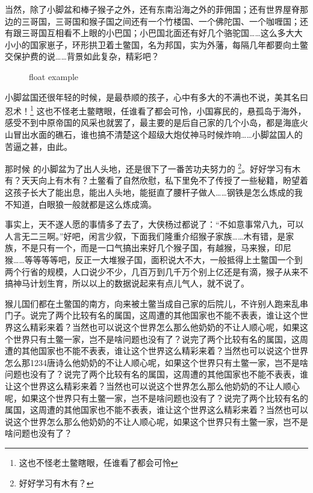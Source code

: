\documentclass{article}%
\begin{document}

\drawgrid{\linewidth}%
当然，除了小脚盆和棒子猴子之外，还有东南沿海之外的菲佣国；还有世界屋脊那边的三哥国，三哥国和猴子国之间还有一个竹楼国、一个佛陀国、一个咖喱国；还有跟三哥国互相看不上眼的小巴国；小巴国北面还有好几个骆驼国……这么多大大小小的国家崽子，环形拱卫着土鳖国，名为邦国，实为外藩，每隔几年都要向土鳖交保护费的说……背景如此复杂，精彩吧？


\begin{figure}[b]
  \centering
  \caption{float example}\label{fig:floateg}
\end{figure}

\newlength{\zitigao}

小脚盆国还很年轻的时候，是最恭顺的孩子，心中有多大的不满也不说，美其名曰忍术！\footnote{这也不怪老土鳖瞎眼，任谁看了都会可怜}
这也不怪老土鳖瞎眼，任谁看了都会可怜，小国寡民的，悬孤岛于海外，感受不到中原帝国的风采也就罢了，最主要的是后自己家的几个小岛，都是海底火山冒出水面的礁石，谁也搞不清楚这个超级大炮仗神马时候炸响……小脚盆国人的苦逼之甚，由此。\the\baselineskip\the\zitigao

那时候%
的小脚盆为了出人头地，还是很下了一番苦功夫努力的
\footnote{好好学习有木有？}。好好学习有木有？天天向上有木有？土鳖看了自然欣慰，私下里免不了传授了一些秘籍，盼望着这孩子长大了能出息，能出人头地，能挺直了腰杆子做人……钢铁是怎么炼成的我不知道，白眼狼一般就都是这么炼成滴。

事实上，天不遂人愿的事情多了去了，大侠杨过都说了：“不如意事常八九，可以人言无二三啊。”好吧，闲言少叙，下面我们隆重介绍猴子家族……木有错，是家族，不是只有一个，而是一口气搞出来好几个猴子国，有越猴，马来猴，印尼猴……等等等等吧，反正一大堆猴子国，面积说大不大，一般抵得上土鳖国一个到两个行省的规模，人口说少不少，几百万到几千万个别上亿还是有滴，猴子从来不搞神马计划生育，所以以上的数据说起来有点儿气人，就不说了。

猴儿国们都在土鳖国的南方，向来被土鳖当成自己家的后院儿，不许别人跑来乱串门子。说完了两个比较有名的属国，这周遭的其他国家也不能不表表，谁让这个世界这么精彩来着？当然也可以说这个世界怎么那么他奶奶的不让人顺心呢，如果这个世界只有土鳖一家，岂不是啥问题也没有了？说完了两个比较有名的属国，这周遭的其他国家也不能不表表，谁让这个世界这么精彩来着？当然也可以说这个世界怎么那1234唐诗么他奶奶的不让人顺心呢，如果这个世界只有土鳖一家，岂不是啥问题也没有了？说完了两个比较有名的属国，这周遭的其他国家也不能不表表，谁让这个世界这么精彩来着？当然也可以说这个世界怎么那么他奶奶的不让人顺心呢，如果这个世界只有土鳖一家，岂不是啥问题也没有了？说完了两个比较有名的属国，这周遭的其他国家也不能不表表，谁让这个世界这么精彩来着？当然也可以说这个世界怎么那么他奶奶的不让人顺心呢，如果这个世界只有土鳖一家，岂不是啥问题也没有了？
\end{document}
